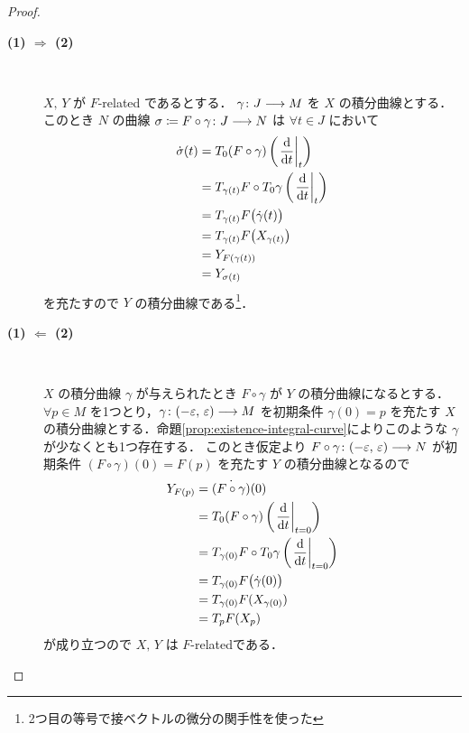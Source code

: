 \documentclass[geometry_main]{subfiles}
\begin{document}
\begin{proof}
    \begin{description}
        \item[\textbf{(1) $\bm{\Longrightarrow}$ (2)}]　
        
        $X,\, Y$ が $F$-related であるとする．
        $\gamma \colon J \longrightarrow M$ を $X$ の積分曲線とする．このとき $N$ の\cinfty 曲線 $\sigma \coloneqq F \circ \gamma\colon J \longrightarrow N$ は $\forall t \in J$ において
        \begin{align}
            \dot{\sigma} (t) &= T_0 (F \circ \gamma) \left( \eval{\dv{}{t}}_{t} \right) \\
            &= T_{\gamma(t)} F \circ T_0 \gamma \left( \eval{\dv{}{t}}_{t} \right) \\
            &= T_{\gamma(t)} F \bigl( \dot{\gamma} (t) \bigr) \\
            &= T_{\gamma(t)} F \bigl( X_{\gamma(t)} \bigr) \\
            &= Y_{F (\gamma(t))} \\
            &= Y_{\sigma(t)}
        \end{align}
        を充たすので $Y$ の積分曲線である\footnote{2つ目の等号で接ベクトルの微分の関手性を使った}．

        \item[\textbf{(1) $\bm{\Longleftarrow}$ (2)}] 　
        
        $X$ の積分曲線 $\gamma$ が与えられたとき $F \circ \gamma$ が $Y$ の積分曲線になるとする．
        $\forall p \in M$ を1つとり，$\gamma \colon (-\varepsilon,\, \varepsilon) \longrightarrow M$ を初期条件 $\gamma(0) = p$ を充たす $X$ の積分曲線とする．命題\ref{prop:existence-integral-curve}によりこのような $\gamma$ が少なくとも1つ存在する．
        このとき仮定より $F \circ \gamma \colon (-\varepsilon,\, \varepsilon) \longrightarrow N$ が初期条件 $(F\circ \gamma)(0) = F(p)$ を充たす $Y$ の積分曲線となるので
        \begin{align}
            Y_{F(p)} &= \dot{(F \circ \gamma)} (0) \\
            &= T_{0} (F \circ \gamma) \left( \eval{\dv{}{t}}_{t=0} \right) \\
            &= T_{\gamma(0)} F \circ T_0 \gamma \left( \eval{\dv{}{t}}_{t=0} \right) \\
            &= T_{\gamma(0)} F \bigl( \dot{\gamma}(0) \bigr) \\
            &= T_{\gamma(0)} F (X_{\gamma(0)}) \\
            &= T_{p} F (X_p)
        \end{align}
        が成り立つので $X,\, Y$ は $F$-relatedである．
    \end{description}
    
\end{proof}
\end{document}
